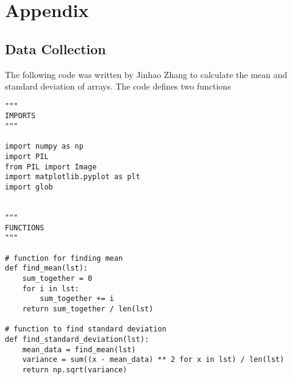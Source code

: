 \documentclass[10pt, preprint]{aastex}
\begin{document}


\section*{Appendix} \label{Appendix}

\subsection{Data Collection}\label{code:collect}

The following code was written by Jinhao Zhang to calculate the mean and standard deviation of arrays. The code defines two functions

\begin{verbatim}
"""
IMPORTS
"""

import numpy as np
import PIL
from PIL import Image
import matplotlib.pyplot as plt
import glob


"""
FUNCTIONS
"""

# function for finding mean
def find_mean(lst):
    sum_together = 0
    for i in lst:
        sum_together += i
    return sum_together / len(lst)

# function to find standard deviation
def find_standard_deviation(lst):
    mean_data = find_mean(lst)
    variance = sum((x - mean_data) ** 2 for x in lst) / len(lst)
    return np.sqrt(variance)
    
\end{verbatim}
\end{document}
